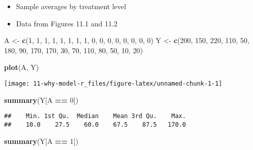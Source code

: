 \documentclass[10pt,]{book}
\newenvironment{Shaded}{\begin{snugshade}}{\end{snugshade}}
\newcommand{\DecValTok}[1]{\textcolor[rgb]{0.00,0.00,0.81}{#1}}
\newcommand{\KeywordTok}[1]{\textcolor[rgb]{0.13,0.29,0.53}{\textbf{#1}}}
\newcommand{\NormalTok}[1]{#1}
\newcommand{\OperatorTok}[1]{\textcolor[rgb]{0.81,0.36,0.00}{\textbf{#1}}}
\newcommand{\StringTok}[1]{\textcolor[rgb]{0.31,0.60,0.02}{#1}}
\providecommand{\tightlist}{%
  \setlength{\itemsep}{0pt}\setlength{\parskip}{0pt}}
\begin{document}
\begin{itemize}
\tightlist
\item
  Sample averages by treatment level
\item
  Data from Figures 11.1 and 11.2
\end{itemize}

\begin{Shaded}
\begin{Highlighting}[]
\NormalTok{A <-}\StringTok{ }\KeywordTok{c}\NormalTok{(}\DecValTok{1}\NormalTok{, }\DecValTok{1}\NormalTok{, }\DecValTok{1}\NormalTok{, }\DecValTok{1}\NormalTok{, }\DecValTok{1}\NormalTok{, }\DecValTok{1}\NormalTok{, }\DecValTok{1}\NormalTok{, }\DecValTok{1}\NormalTok{, }\DecValTok{0}\NormalTok{, }\DecValTok{0}\NormalTok{, }\DecValTok{0}\NormalTok{, }\DecValTok{0}\NormalTok{, }\DecValTok{0}\NormalTok{, }\DecValTok{0}\NormalTok{, }\DecValTok{0}\NormalTok{, }\DecValTok{0}\NormalTok{)}
\NormalTok{Y <-}\StringTok{ }\KeywordTok{c}\NormalTok{(}\DecValTok{200}\NormalTok{, }\DecValTok{150}\NormalTok{, }\DecValTok{220}\NormalTok{, }\DecValTok{110}\NormalTok{, }\DecValTok{50}\NormalTok{, }\DecValTok{180}\NormalTok{, }\DecValTok{90}\NormalTok{, }\DecValTok{170}\NormalTok{, }\DecValTok{170}\NormalTok{, }\DecValTok{30}\NormalTok{,}
       \DecValTok{70}\NormalTok{, }\DecValTok{110}\NormalTok{, }\DecValTok{80}\NormalTok{, }\DecValTok{50}\NormalTok{, }\DecValTok{10}\NormalTok{, }\DecValTok{20}\NormalTok{)}

\KeywordTok{plot}\NormalTok{(A, Y)}
\end{Highlighting}
\end{Shaded}

\begin{center}\texttt{[image: 11-why-model-r\_files/figure-latex/unnamed-chunk-1-1]} \end{center}

\begin{Shaded}
\begin{Highlighting}[]
\KeywordTok{summary}\NormalTok{(Y[A }\OperatorTok{==}\StringTok{ }\DecValTok{0}\NormalTok{])}
\end{Highlighting}
\end{Shaded}

\begin{verbatim}
##    Min. 1st Qu.  Median    Mean 3rd Qu.    Max. 
##    10.0    27.5    60.0    67.5    87.5   170.0
\end{verbatim}

\begin{Shaded}
\begin{Highlighting}[]
\KeywordTok{summary}\NormalTok{(Y[A }\OperatorTok{==}\StringTok{ }\DecValTok{1}\NormalTok{])}
\end{Highlighting}
\end{Shaded}
\end{document}

